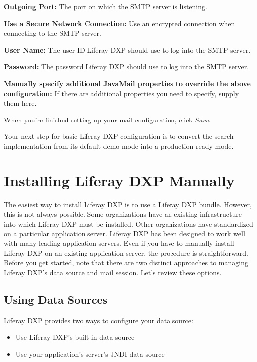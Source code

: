 \textbf{Outgoing Port:} The port on which the SMTP server is listening.

\textbf{Use a Secure Network Connection:} Use an encrypted connection
when connecting to the SMTP server.

\textbf{User Name:} The user ID Liferay DXP should use to log into the
SMTP server.

\textbf{Password:} The password Liferay DXP should use to log into the
SMTP server.

\textbf{Manually specify additional JavaMail properties to override the
above configuration:} If there are additional properties you need to
specify, supply them here.

When you're finished setting up your mail configuration, click
\emph{Save}.

Your next step for basic Liferay DXP configuration is to convert the
search implementation from its default demo mode into a production-ready
mode.

\section{Installing Liferay DXP
Manually}\label{installing-liferay-dxp-manually}

The easiest way to install Liferay DXP is to
\href{/docs/7-0/deploy/-/knowledge_base/d/installing-product}{use a
Liferay DXP bundle}. However, this is not always possible. Some
organizations have an existing infrastructure into which Liferay DXP
must be installed. Other organizations have standardized on a particular
application server. Liferay DXP has been designed to work well with many
leading application servers. Even if you have to manually install
Liferay DXP on an existing application server, the procedure is
straightforward. Before you get started, note that there are two
distinct approaches to managing Liferay DXP's data source and mail
session. Let's review these options.

\subsection{Using Data Sources}\label{using-data-sources}

Liferay DXP provides two ways to configure your data source:

\begin{itemize}
\tightlist
\item
  Use Liferay DXP's built-in data source
\item
  Use your application's server's JNDI data source
\end{itemize}

